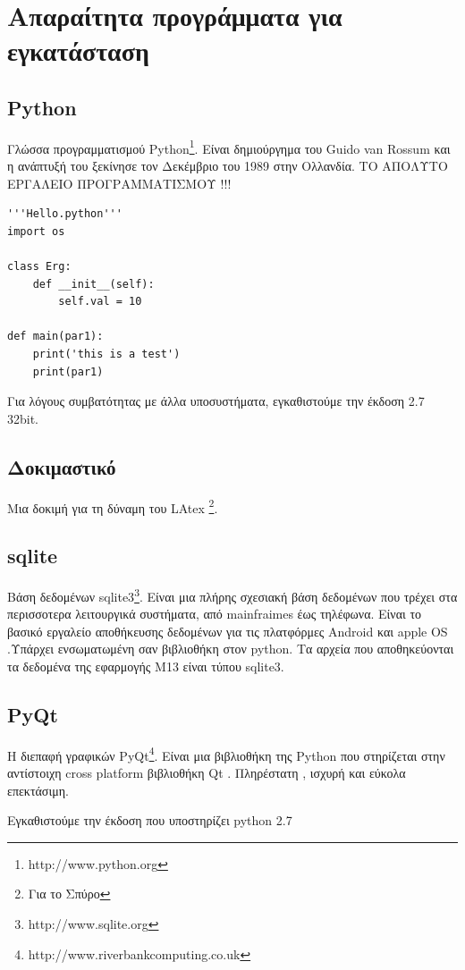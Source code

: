 \documentclass[A4,10pt,greek]{book}
\begin{document}
\section{Απαραίτητα προγράμματα για εγκατάσταση}

\subsection{Python}
Γλώσσα προγραμματισμού Python\footnote{http://www.python.org}. Είναι δημιούργημα του Guido van Rossum και η ανάπτυξή του ξεκίνησε τον Δεκέμβριο του 1989 στην Ολλανδία. ΤΟ ΑΠΟΛΥΤΟ ΕΡΓΑΛΕΙΟ ΠΡΟΓΡΑΜΜΑΤΙΣΜΟΥ !!!

\begin{lstlisting}[caption=Python example]
'''Hello.python'''
import os

class Erg:
    def __init__(self):
        self.val = 10

def main(par1):
    print('this is a test')
    print(par1)

\end{lstlisting}

Για λόγους συμβατότητας με άλλα υποσυστήματα, εγκαθιστούμε την έκδοση 2.7 32bit.

\subsection{Δοκιμαστικό}
Μια δοκιμή για τη δύναμη του LAtex \footnote{Για το Σπύρο}.   

\subsection{sqlite}
Bάση δεδομένων  sqlite3\footnote{http://www.sqlite.org}.  Είναι μια πλήρης σχεσιακή βάση δεδομένων που τρέχει στα περισσοτερα  λειτουργικά συστήματα, από mainfraimes έως τηλέφωνα. Είναι το βασικό εργαλείο αποθήκευσης δεδομένων για τις πλατφόρμες Android και apple OS  .Υπάρχει ενσωματωμένη σαν βιβλιοθήκη στον python. Τα αρχεία που αποθηκεύονται τα δεδομένα της εφαρμογής Μ13 είναι τύπου sqlite3. 

\subsection{PyQt}
Η διεπαφή γραφικών  PyQt\footnote{http://www.riverbankcomputing.co.uk}. Είναι μια βιβλιοθήκη της Python που στηρίζεται στην αντίστοιχη cross platform βιβλιοθήκη Qt . Πληρέστατη , ισχυρή και εύκολα επεκτάσιμη.

Εγκαθιστούμε την έκδοση που υποστηρίζει python 2.7
\end{document}
